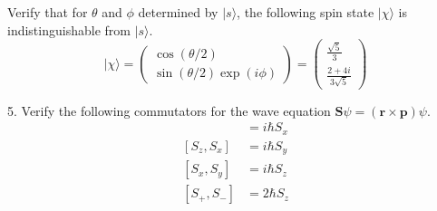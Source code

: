 Verify that for $\theta$ and $\phi$ determined by $|s\rangle$,
the following spin state $|\chi\rangle$ is indistinguishable from $|s\rangle$.
\begin{equation*}
|\chi\rangle
=\begin{pmatrix}\cos(\theta/2)\\\sin(\theta/2)\exp(i\phi)\end{pmatrix}
=\begin{pmatrix}\frac{\sqrt5}{3}\\[1ex]\frac{2+4i}{3\sqrt5}\end{pmatrix}
\end{equation*}

5. Verify the following commutators for the wave equation
$\mathbf S\psi=(\mathbf r\times\mathbf p)\psi$.
\begin{align*}
[S_y,S_z]&=i\hbar S_x
\\
[S_z,S_x]&=i\hbar S_y
\\
[S_x,S_y]&=i\hbar S_z
\\[1ex]
[S_+,S_-]&=2\hbar S_z
\end{align*}


